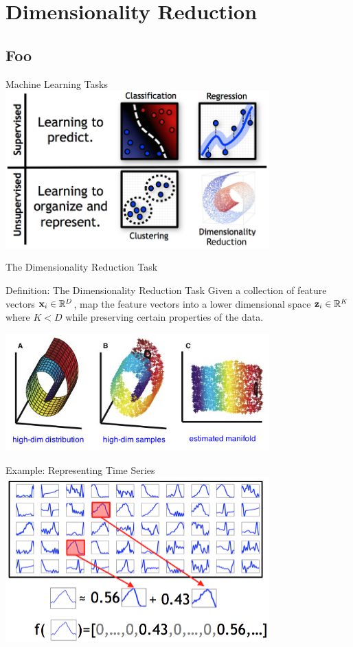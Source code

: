 \documentclass[serif,xcolor=pdftex,dvipsnames,table,hyperref={bookmarks=false,breaklinks}]{beamer}
\begin{document}
\maketitlepage

\section{Dimensionality Reduction}
\subsection{Foo}

\begin{frame}[t]{Machine Learning Tasks}
 \centering
 \includegraphics[width=4in]{../Figures/learning_problems.png}
\end{frame}


\begin{frame}[t]{The Dimensionality Reduction Task}

\begin{block}{Definition: The Dimensionality Reduction Task}
Given a collection of feature vectors ${\mathbf{x}}_i\in\mathbb{R}^D$, map the 
feature vectors into a lower dimensional space ${\mathbf{z}}_i\in\mathbb{R}^K$ where 
$K<D$ while preserving certain properties of the data.
\end{block}

\pause
\center
\includegraphics[width=4in]{../Figures/manifold_unrolling.png}
\end{frame}

\begin{frame}[t]{Example: Representing Time Series}
\center
\includegraphics[width=4in]{../Figures/spase_coding_time_series.png}
\end{frame}
\end{document}
